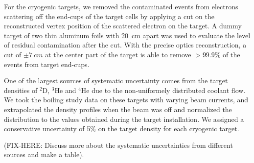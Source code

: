 For the cryogenic targets, we removed the contaminated events from electrons scattering off the end-cups of the target cells by applying a cut on the reconstructed vertex position of the scattered electron on the target. A dummy target of two thin aluminum foils with 20~cm apart was used to evaluate the level of residual contamination after the cut. With the precise optics reconstruction, a cut of $\pm 7~cm$ at the center part of the target is able to remove $>99.9\%$ of the events from target end-cups.

One of the largest sources of systematic uncertainty comes from the target densities of $\mathrm{^{2}D}$, $\mathrm{^{3}He}$ and $\mathrm{^{4}He}$ due to the non-uniformely distributed coolant flow.  We took the boiling study data on these targets with varying beam currents, and extrapolated the density profiles when the beam was off and normalized the distribution to the values obtained during the target installation. We assigned a conservative uncertainty of 5\% on the target density for each cryogenic target. 

(FIX-HERE: Discuss more about the systematic uncertainties from different sources and make a table).

